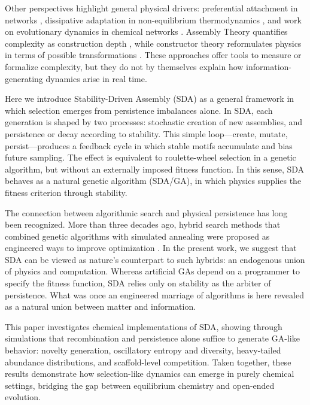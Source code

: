 \documentclass[life,article,submit,pdftex,moreauthors]{Definitions/mdpi}
\begin{document}
Other perspectives highlight general physical drivers: preferential attachment in networks \cite{barabasi1999emergence}, dissipative adaptation in non-equilibrium thermodynamics \cite{prigogine1977self, england2015dissipative}, and work on evolutionary dynamics in chemical networks \cite{wu2012origin, nowak2006evolutionary}. Assembly Theory quantifies complexity as construction depth \cite{walker2023nature}, while constructor theory reformulates physics in terms of possible transformations \cite{deutsch2013constructor}. These approaches offer tools to measure or formalize complexity, but they do not by themselves explain how information-generating dynamics arise in real time.

Here we introduce Stability-Driven Assembly (SDA) as a general framework in which selection emerges from persistence imbalances alone. In SDA, each generation is shaped by two processes: stochastic creation of new assemblies, and persistence or decay according to stability. This simple loop—create, mutate, persist—produces a feedback cycle in which stable motifs accumulate and bias future sampling. The effect is equivalent to roulette-wheel selection in a genetic algorithm, but without an externally imposed fitness function. In this sense, SDA behaves as a natural genetic algorithm (SDA/GA), in which physics supplies the fitness criterion through stability.

The connection between algorithmic search and physical persistence has long been recognized. More than three decades ago, hybrid search methods that combined genetic algorithms with simulated annealing were proposed as engineered ways to improve optimization \cite{adler1993marriage}. In the present work, we suggest that SDA can be viewed as nature’s counterpart to such hybrids: an endogenous union of physics and computation. Whereas artificial GAs depend on a programmer to specify the fitness function, SDA relies only on stability as the arbiter of persistence. What was once an engineered marriage of algorithms is here revealed as a natural union between matter and information.

This paper investigates chemical implementations of SDA, showing through simulations that recombination and persistence alone suffice to generate GA-like behavior: novelty generation, oscillatory entropy and diversity, heavy-tailed abundance distributions, and scaffold-level competition. Taken together, these results demonstrate how selection-like dynamics can emerge in purely chemical settings, bridging the gap between equilibrium chemistry and open-ended evolution.
\end{document}

